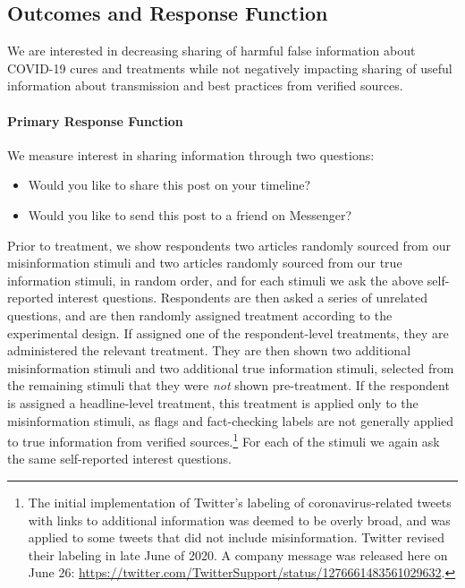 \documentclass[letterpaper, 12pt, parskip=full,]{scrartcl}
\begin{document}
\subsection{Outcomes and Response Function}

We are interested in decreasing sharing of harmful false information about COVID-19 cures and treatments while not negatively impacting sharing of useful information about transmission and best practices from verified sources. 

\paragraph{Primary Response Function}

We measure interest in sharing information through two questions:
\begin{itemize}
\item Would you like to share this post on your timeline? 
\item Would you like to send this post to a friend on Messenger?
\end{itemize}

Prior to treatment, we show respondents two articles randomly sourced from our misinformation stimuli and two articles randomly sourced from our true information stimuli, in random order, and for each stimuli we ask the above self-reported interest questions. Respondents are then asked a series of unrelated questions, and are then randomly assigned treatment according to the experimental design. If assigned one of the respondent-level treatments, they are administered the relevant treatment. They are then shown two additional misinformation stimuli and two additional true information stimuli, selected from the remaining stimuli that they were \textit{not} shown pre-treatment. If the respondent is assigned a headline-level treatment, this treatment is applied only to the misinformation stimuli, as flags and fact-checking labels are not generally applied to true information from verified sources.\footnote{The initial implementation of Twitter's labeling of coronavirus-related tweets with links to additional information was deemed to be overly broad, and was applied to some tweets that did not include misinformation. Twitter revised their labeling in late June of 2020. A company message was released here on June 26: \url{https://twitter.com/TwitterSupport/status/1276661483561029632}. } For each of the stimuli we again ask the same self-reported interest questions. 
\end{document}
